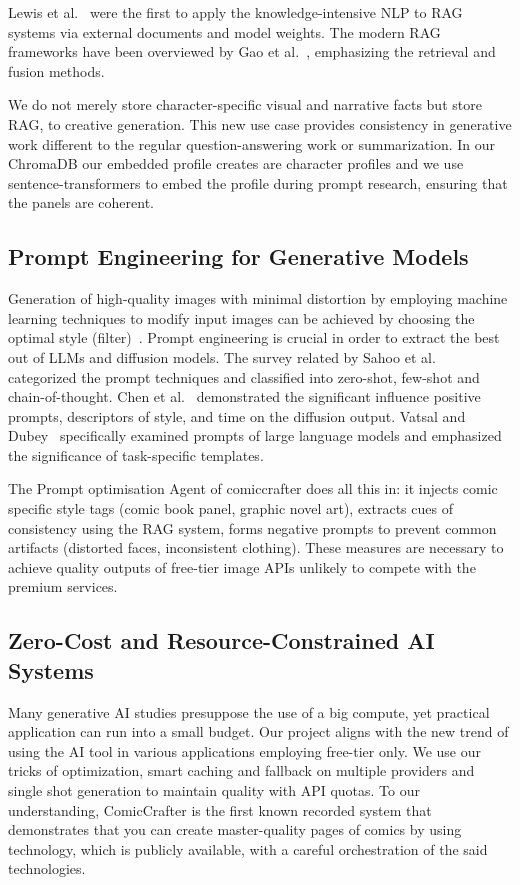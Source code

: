 \documentclass[runningheads]{llncs}
\begin{document}
Lewis et al.~\cite{lewis2020retrieval} were the first to apply the knowledge-intensive NLP to RAG systems via external documents and model weights. The modern RAG frameworks have been overviewed by Gao et al.~\cite{gao2024rag}, emphasizing the retrieval and fusion methods.

We do not merely store character-specific visual and narrative facts but store RAG, to creative generation. This new use case provides consistency in generative work different to the regular question-answering work or summarization. In our ChromaDB our embedded profile creates are character profiles and we use sentence-transformers to embed the profile during prompt research, ensuring that the panels are coherent.

\subsection{Prompt Engineering for Generative Models}

Generation of high-quality images with minimal distortion by employing machine learning techniques to modify input images can be achieved by choosing the optimal style (filter)~\cite{chen2024unleashing}. Prompt engineering is crucial in order to extract the best out of LLMs and diffusion models. The survey related by Sahoo et al.~\cite{sahoo2024survey} categorized the prompt techniques and classified into zero-shot, few-shot and chain-of-thought. Chen et al.~\cite{chen2024unleashing} demonstrated the significant influence positive prompts, descriptors of style, and time on the diffusion output. Vatsal and Dubey~\cite{vatsal2024survey} specifically examined prompts of large language models and emphasized the significance of task-specific templates.

The Prompt optimisation Agent of comiccrafter does all this in: it injects comic specific style tags (comic book panel, graphic novel art), extracts cues of consistency using the RAG system, forms negative prompts to prevent common artifacts (distorted faces, inconsistent clothing). These measures are necessary to achieve quality outputs of free-tier image APIs unlikely to compete with the premium services.

\subsection{Zero-Cost and Resource-Constrained AI Systems}

Many generative AI studies presuppose the use of a big compute, yet practical application can run into a small budget. Our project aligns with the new trend of using the AI tool in various applications employing free-tier only. We use our tricks of optimization, smart caching and fallback on multiple providers and single shot generation to maintain quality with API quotas. To our understanding, ComicCrafter is the first known recorded system that demonstrates that you can create master-quality pages of comics by using technology, which is publicly available, with a careful orchestration of the said technologies.
\end{document}
